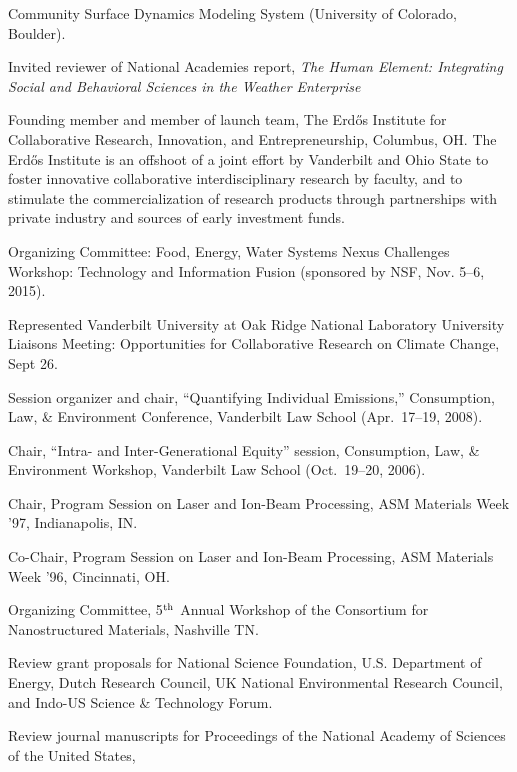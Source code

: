   Community Surface Dynamics Modeling System (University of Colorado, Boulder).
\item[2017] Invited reviewer of National Academies report,
  \emph{The Human Element: Integrating Social and Behavioral Sciences in the
    Weather Enterprise}
\item[2017] Founding member and member of launch team,
  The Erd\H{o}s Institute for Collaborative Research, Innovation, and
  Entrepreneurship, Columbus, OH.
  The Erd\H{o}s Institute is an offshoot of a joint effort by Vanderbilt and
  Ohio State to foster innovative collaborative interdisciplinary research by
  faculty, and to stimulate the commercialization of research products through
  partnerships with private industry and sources of early investment funds.
\item[2015] Organizing Committee:
  Food, Energy, Water Systems Nexus Challenges Workshop: Technology and
  Information Fusion (sponsored by NSF, Nov. 5--6, 2015).
\item[2007] Represented Vanderbilt University at Oak Ridge National Laboratory
  University Liaisons Meeting: Opportunities for Collaborative Research on
  Climate Change, Sept 26.
\item[2008] Session organizer and chair, ``Quantifying Individual Emissions,''
  Consumption, Law, \& Environment Conference, Vanderbilt Law School
  (Apr.\ 17--19, 2008).
\item[2006] Chair, ``Intra- and Inter-Generational Equity'' session,
  Consumption, Law, \& Environment Workshop, Vanderbilt Law School
  (Oct.~19--20, 2006).
\item[1997] Chair, Program Session on Laser and Ion-Beam Processing,
  ASM Materials Week '97, In\-di\-an\-a\-po\-lis, IN.
\item[1996] Co-Chair, Program Session on Laser and Ion-Beam Processing,
  ASM Materials Week '96, Cincinnati, OH.
\item[1996] Organizing Committee,
   5$^{\mbox{\scriptsize th}}$ Annual Workshop of the Consortium for
   Nanostructured Materials, Nashville TN.
\item[Ongoing] Review grant proposals for National Science Foundation,
  U.S. Department of Energy,
  Dutch Research Council,
  UK National Environmental Research Council,
  and Indo-US Science \& Technology Forum.
\item[Ongoing] Review journal manuscripts for
  Proceedings of the National Academy of Sciences of the United States,
